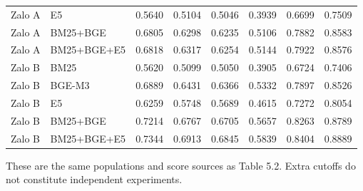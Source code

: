 \begin{table}[H]
{\begin{tabular}{@{}llrrrrrr@{}}
Zalo A & E5 & 0.5640 & 0.5104 & 0.5046 & 0.3939 & 0.6699 & 0.7509 \\
Zalo A & BM25+BGE & 0.6805 & 0.6298 & 0.6235 & 0.5106 & 0.7882 & 0.8583 \\
Zalo A & BM25+BGE+E5 & 0.6818 & 0.6317 & 0.6254 & 0.5144 & 0.7922 & 0.8576 \\
Zalo B & BM25 & 0.5620 & 0.5099 & 0.5050 & 0.3905 & 0.6724 & 0.7406 \\
Zalo B & BGE-M3 & 0.6889 & 0.6431 & 0.6366 & 0.5332 & 0.7897 & 0.8526 \\
Zalo B & E5 & 0.6259 & 0.5748 & 0.5689 & 0.4615 & 0.7272 & 0.8054 \\
Zalo B & BM25+BGE & 0.7214 & 0.6767 & 0.6705 & 0.5657 & 0.8263 & 0.8789 \\
Zalo B & BM25+BGE+E5 & 0.7344 & 0.6913 & 0.6845 & 0.5839 & 0.8404 & 0.8889 \\
\bottomrule
\end{tabular}}
\end{table}

These are the same populations and score sources as Table 5.2. Extra cutoffs do not constitute independent experiments.

